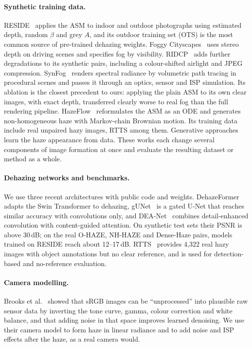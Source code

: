 \documentclass{article}
\begin{document}
\paragraph{Synthetic training data.} RESIDE~\cite{li2019reside} applies the ASM to indoor and outdoor photographs using estimated depth, random $\beta$ and grey $A$, and its outdoor training set (OTS) is the most common source of pre-trained dehazing weights. Foggy Cityscapes~\cite{sakaridis2018foggy} uses stereo depth on driving scenes and specifies fog by visibility. RIDCP~\cite{wu2023ridcp} adds further degradations to its synthetic pairs, including a colour-shifted airlight and JPEG compression. SynFog~\cite{xie2024synfog} renders spectral radiance by volumetric path tracing in procedural scenes and passes it through an optics, sensor and ISP simulation. Its ablation is the closest precedent to ours: applying the plain ASM to its own clear images, with exact depth, transferred clearly worse to real fog than the full rendering pipeline. HazeFlow~\cite{shin2025hazeflow} reformulates the ASM as an ODE and generates non-homogeneous haze with Markov-chain Brownian motion. Its training data include real unpaired hazy images, RTTS among them. Generative approaches~\cite{wang2025hazegen} learn the haze appearance from data. These works each change several components of image formation at once and evaluate the resulting dataset or method as a whole.

\paragraph{Dehazing networks and benchmarks.} We use three recent architectures with public code and weights. DehazeFormer~\cite{song2023dehazeformer} adapts the Swin Transformer to dehazing, gUNet~\cite{song2022gunet} is a gated U-Net that reaches similar accuracy with convolutions only, and DEA-Net~\cite{chen2024deanet} combines detail-enhanced convolution with content-guided attention. On synthetic test sets their PSNR is above 30\,dB; on the real O-HAZE, NH-HAZE and Dense-Haze pairs, models trained on RESIDE reach about 12--17\,dB. RTTS~\cite{li2019reside} provides 4{,}322 real hazy images with object annotations but no clear reference, and is used for detection-based and no-reference evaluation.

\paragraph{Camera modelling.} Brooks et al.~\cite{brooks2019unprocessing} showed that sRGB images can be ``unprocessed'' into plausible raw sensor data by inverting the tone curve, gamma, colour correction and white balance, and that adding noise in that space improves learned denoising. We use their camera model to form haze in linear radiance and to add noise and ISP effects after the haze, as a real camera would.
\end{document}
